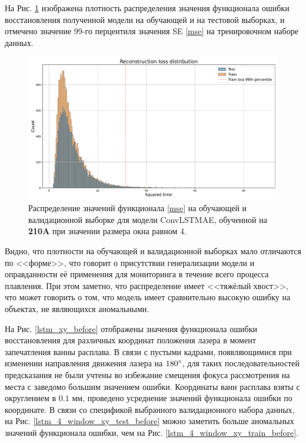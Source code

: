 \documentclass{article}
\begin{document}
    На Рис. \ref{model_4_loss_distr} изображена плотность распределения значения функционала ошибки восстановления полученной модели на обучающей и на тестовой выборках, и отмечено значение 99-го перцентиля значения SE \eqref{mse} на тренировочном наборе данных.

    \begin{figure}[]
        \centering
        \includegraphics[scale=0.3]{model_4_loss_distr.pdf}
        \caption{Распределение значений функционала \eqref{mse} на обучающей и валидационной выборке для модели ConvLSTMAE, обученной на \textbf{210A} при значении размера окна равном 4.}
        \label{model_4_loss_distr}
    \end{figure}

    Видно, что плотности на обучающей и валидационной выборках мало отличаются по <<форме>>, что говорит о присутствии генерализации модели и оправданности её применения для мониторинга в течение всего процесса плавления. При этом заметно, что распределение имеет <<тяжёлый хвост>>, что может говорить о том, что модель имеет сравнительно высокую ошибку на объектах, не являющихся аномальными.

    На Рис. \ref{lstm_xy_before} отображены значения функционала ошибки восстановления для различных координат положения лазера в момент запечатления ванны расплава. В связи с пустыми кадрами, появляющимися при изменении направления движения лазера на $180\degree$, для таких последовательностей предсказания не были учтены во избежание смещения фокуса рассмотрения на места с заведомо большим значением ошибки. Координаты ванн расплава взяты с округлением в $0.1$ мм, проведено усреднение значений функционала ошибки по координате. В связи со спецификой выбранного валидационного набора данных, на Рис. \ref{lstm_4_window_xy_test_before} можно заметить больше аномальных значений функционала ошибки, чем на Рис. \ref{lstm_4_window_xy_train_before}. 
\end{document}

